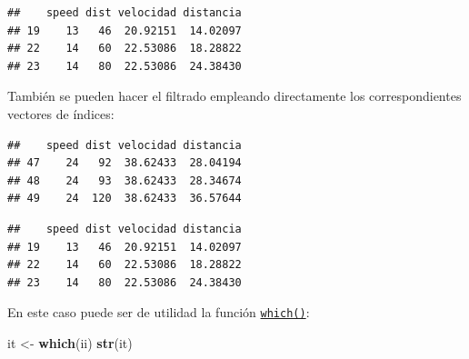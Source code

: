 \documentclass[]{book}
\newenvironment{Shaded}{\begin{snugshade}}{\end{snugshade}}
\newcommand{\CommentTok}[1]{\textcolor[rgb]{0.56,0.35,0.01}{\textit{#1}}}
\newcommand{\DecValTok}[1]{\textcolor[rgb]{0.00,0.00,0.81}{#1}}
\newcommand{\KeywordTok}[1]{\textcolor[rgb]{0.13,0.29,0.53}{\textbf{#1}}}
\newcommand{\NormalTok}[1]{#1}
\newcommand{\OperatorTok}[1]{\textcolor[rgb]{0.81,0.36,0.00}{\textbf{#1}}}
\newcommand{\StringTok}[1]{\textcolor[rgb]{0.31,0.60,0.02}{#1}}
\begin{document}
\begin{verbatim}
##    speed dist velocidad distancia
## 19    13   46  20.92151  14.02097
## 22    14   60  22.53086  18.28822
## 23    14   80  22.53086  24.38430
\end{verbatim}

También se pueden hacer el filtrado empleando directamente los
correspondientes vectores de índices:

\begin{Shaded}
\end{Shaded}

\begin{verbatim}
##    speed dist velocidad distancia
## 47    24   92  38.62433  28.04194
## 48    24   93  38.62433  28.34674
## 49    24  120  38.62433  36.57644
\end{verbatim}

\begin{Shaded}
\end{Shaded}

\begin{verbatim}
##    speed dist velocidad distancia
## 19    13   46  20.92151  14.02097
## 22    14   60  22.53086  18.28822
## 23    14   80  22.53086  24.38430
\end{verbatim}

En este caso puede ser de utilidad la función \href{https://www.rdocumentation.org/packages/base/versions/3.6.1/topics/which}{\texttt{which()}}:

\begin{Shaded}
\begin{Highlighting}[]
\NormalTok{it <-}\StringTok{ }\KeywordTok{which}\NormalTok{(ii)}
\KeywordTok{str}\NormalTok{(it)}
\end{Highlighting}
\end{Shaded}
\end{document}

